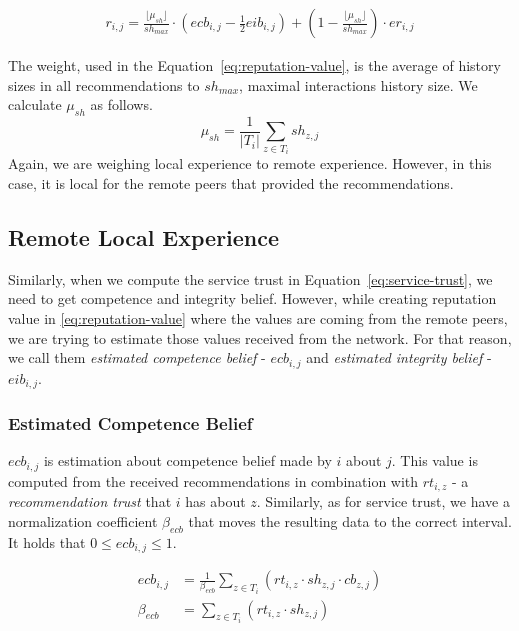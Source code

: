 \begin{equation}
\label{eq:reputation-value}
\begin{split}
    r_{i, j}=\frac{\lfloor\mu_{sh}\rfloor}{sh_{max}} \cdot \left(ecb_{i,j}-\frac{1}{2} eib_{i, j}\right) + \left(1-\frac{\lfloor\mu_{sh}\rfloor}{sh_{max}}\right) \cdot er_{i,j}
\end{split}
\end{equation}

\noindent
The weight, used in the Equation~\ref{eq:reputation-value}, is the average of history sizes in all recommendations to $sh_{max}$, maximal interactions history size. 
We calculate $\mu_{sh}$ as follows.
\begin{equation}
    \mu_{sh} = \frac{1}{|T_{i}|} \sum_{z \in T_{i}} sh_{z, j}
\end{equation}
\noindent
Again, we are weighing local experience to remote experience. However, in this case, it is local for the remote peers that provided the recommendations.

\subsection{Remote Local Experience}
\label{subsec:remote-local-experience}
Similarly, when we compute the service trust in Equation~\ref{eq:service-trust}, we need to get competence and integrity belief.
However, while creating reputation value in \ref{eq:reputation-value} where the values are coming from the remote peers, we are trying to estimate those values received from the network.
For that reason, we call them \textit{estimated competence belief} - $ecb_{i,j}$ and \textit{estimated integrity belief} - $eib_{i,j}$.

\subsubsection{Estimated Competence Belief}
$ecb_{i,j}$ is estimation about competence belief made by $i$ about $j$. 
This value is computed from the received recommendations in combination with $rt_{i,z}$ - a \textit{recommendation trust} that $i$ has about $z$.
Similarly, as for service trust, we have a normalization coefficient $\beta_{ecb}$ that moves the resulting data to the correct interval.
It holds that $0 \leq ecb_{i,j} \leq 1$.

\begin{equation}
\label{eq:estimated-competence-belief}
\begin{split}
    ecb_{i,j} &= \frac{1}{\beta_{ecb}} \sum_{z \in T_{i}} \left(rt_{i, z} \cdot sh_{z, j} \cdot cb_{z, j}\right) \\
    \beta_{ecb} &= \sum_{z \in T_{i}} \left(rt_{i, z} \cdot sh_{z, j}\right)
\end{split}
\end{equation}

